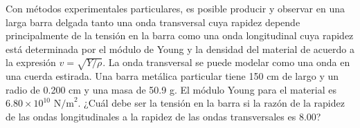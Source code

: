 \item Con métodos experimentales particulares, es posible producir y observar en una larga barra delgada tanto una onda transversal cuya rapidez depende principalmente de la tensión en la barra como una onda longitudinal cuya rapidez está determinada por el módulo de Young y la densidad del material de acuerdo a la expresión $v = \sqrt{Y/\rho}$. La onda transversal se puede modelar como una onda en una cuerda estirada. Una barra metálica particular tiene 150 cm de largo y un radio de 0.200 cm y una masa de 50.9 g. El módulo Young para el material es $6.80 \times 10^{10}\text{ N/m}^2$. ¿Cuál debe ser la tensión en la barra si la razón de la rapidez de las ondas longitudinales a la rapidez de las ondas transversales es 8.00?